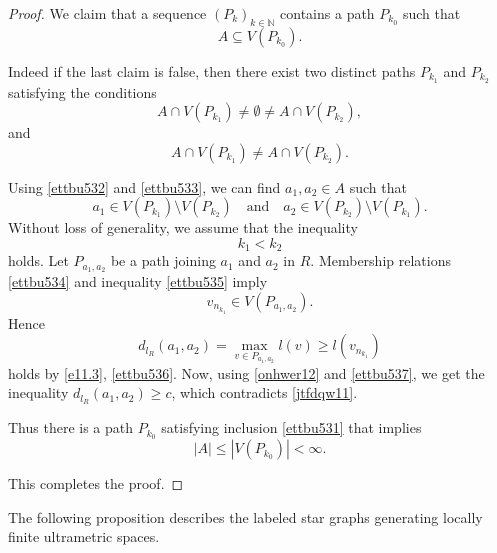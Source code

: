 \documentclass[pdflatex,sn-mathphys-num]{sn-jnl}%
\theoremstyle{thmstyletwo}%
\begin{document}
\begin{proof}
We claim that a sequence $(P_k)_{k \in \mathbb{N}}$ contains a path $P_{k_0}$ such that
\begin{equation}\label{ettbu531}
A \subseteq V(P_{k_0}). 
\end{equation}

Indeed if the last claim is false, then there exist two distinct paths $P_{k_1}$ and $P_{k_2}$ satisfying the conditions
\begin{equation}\label{ettbu532}
A \cap V(P_{k_1}) \neq \emptyset \neq A \cap V(P_{k_2}), 
\end{equation}
and
\begin{equation}\label{ettbu533}
A \cap V(P_{k_1}) \neq A \cap V(P_{k_2}). 
\end{equation}

Using \eqref{ettbu532} and \eqref{ettbu533}, we can find $a_1, a_2 \in A$ such that
\begin{equation}\label{ettbu534}
a_1 \in V(P_{k_1}) \setminus V(P_{k_2}) \quad \text{and} \quad a_2 \in V(P_{k_2}) \setminus V(P_{k_1}). 
\end{equation}
Without loss of generality, we assume that the inequality
\begin{equation}\label{ettbu535}
k_1 < k_2 
\end{equation}
holds. 
Let $P_{a_1,a_2}$ be a path joining $a_1$ and $a_2$ in $R$. 
Membership relations \eqref{ettbu534} and inequality \eqref{ettbu535} imply 
\begin{equation}\label{ettbu536}
v_{n_{k_1}} \in V(P_{a_1,a_2}). 
\end{equation}
Hence
\begin{equation}\label{ettbu537}
d_{l_R}(a_1, a_2) = \max_{v \in P_{a_1,a_2}} l(v)\geq l(v_{n_{k_1}})
\end{equation}
holds by \eqref{e11.3}, \eqref{ettbu536}.
Now, using \eqref{onhwer12} and \eqref{ettbu537}, we get the inequality $d_{l_R}(a_1, a_2) \geq c$,
which contradicts \eqref{jtfdqw11}.

Thus there is a path $P_{k_0}$ satisfying inclusion \eqref{ettbu531} that implies
\begin{equation*}
|A| \leq |V(P_{k_0})| < \infty.
\end{equation*}

This completes the proof.

\end{proof}

The following proposition describes the labeled star graphs generating locally  finite ultrametric spaces.
\end{document}
